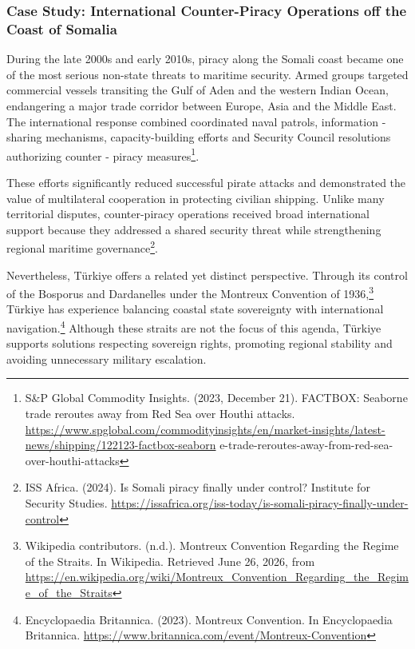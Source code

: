 \subsubsection{Case Study: International Counter-Piracy Operations off the Coast of Somalia}

During the late 2000s and early 2010s, piracy along the Somali coast became one of the most serious non-state threats to maritime security. Armed groups targeted commercial vessels transiting the Gulf of Aden and the western Indian Ocean, endangering a major trade corridor between Europe, Asia and the Middle East. The international response combined coordinated naval patrols, information - sharing mechanisms, capacity-building efforts and Security Council resolutions authorizing counter - piracy measures\footnote{S\&P Global Commodity Insights. (2023, December 21). FACTBOX: Seaborne trade reroutes away from Red Sea over Houthi attacks. \url{https://www.spglobal.com/commodityinsights/en/market-insights/latest-news/shipping/122123-factbox-seaborn} e-trade-reroutes-away-from-red-sea-over-houthi-attacks}.

These efforts significantly reduced successful pirate attacks and demonstrated the value of multilateral cooperation in protecting civilian shipping. Unlike many territorial disputes, counter-piracy operations received broad international support because they addressed a shared security threat while strengthening regional maritime governance\footnote{ISS Africa. (2024). Is Somali piracy finally under control? Institute for Security Studies. \url{https://issafrica.org/iss-today/is-somali-piracy-finally-under-control}}.

Nevertheless, Türkiye offers a related yet distinct perspective. Through its control of the Bosporus and Dardanelles under the Montreux Convention of 1936,\footnote{Wikipedia contributors. (n.d.). Montreux Convention Regarding the Regime of the Straits. In Wikipedia. Retrieved June 26, 2026, from \url{https://en.wikipedia.org/wiki/Montreux_Convention_Regarding_the_Regime_of_the_Straits}} Türkiye has experience balancing coastal state sovereignty with international navigation.\footnote{Encyclopaedia Britannica. (2023). Montreux Convention. In Encyclopaedia Britannica. \url{https://www.britannica.com/event/Montreux-Convention}} Although these straits are not the focus of this agenda, Türkiye supports solutions respecting sovereign rights, promoting regional stability and avoiding unnecessary military escalation.
